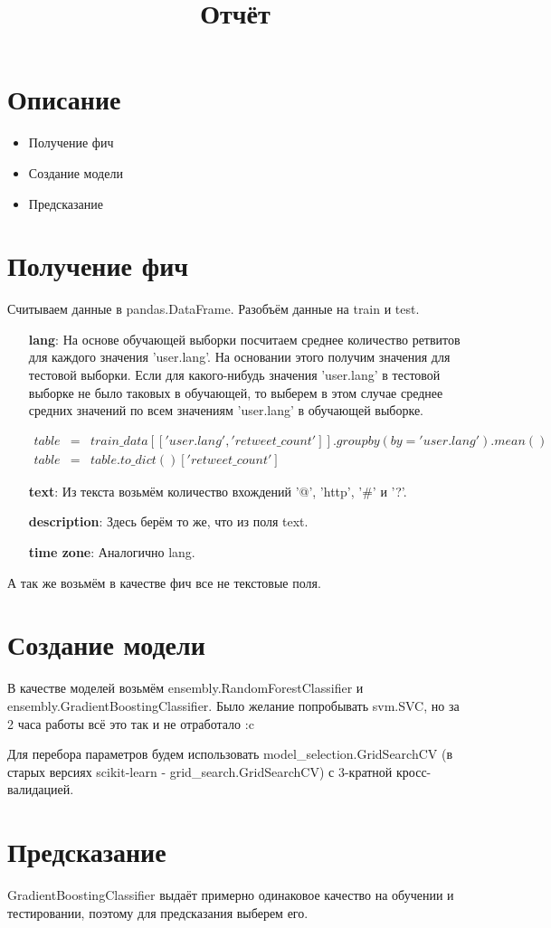 \documentclass[12pt]{article}
\title{Отчёт}
\date{}
\author{}
\begin{document}
 \section{Описание}
 \begin{itemize}
  \item Получение фич
  \item Создание модели
  \item Предсказание
 \end{itemize}
 \section{Получение фич}
 Считываем данные в pandas.DataFrame. Разобъём данные на train и test. 
 \begin{enumerate}
  \item[\textbf{lang}:] На основе обучающей выборки посчитаем среднее количество ретвитов для каждого значения 'user.lang'. На основании этого
			получим значения для тестовой выборки. Если для какого-нибудь значения 'user.lang' в тестовой выборке не было таковых в 
			обучающей, то выберем в этом случае среднее средних значений по всем значениям 'user.lang' в обучающей выборке.
			
			\begin{eqnarray*}
			table &=& train\_data[['user.lang', 'retweet\_count']].groupby(by='user.lang').mean()\\
			table &=& table.to\_dict()['retweet\_count']
			\end{eqnarray*}

  \item[\textbf{text}:] Из текста возьмём количество вхождений '@', 'http', '\#' и '?'.
  \item[\textbf{description}:] Здесь берём то же, что из поля text.
  \item[\textbf{time zone}:] Аналогично lang.
 \end{enumerate}
 А так же возьмём в качестве фич все не текстовые поля. 
\section{Создание модели}

 В качестве моделей возьмём ensembly.RandomForestClassifier и ensembly.GradientBoostingClassifier. Было желание попробывать svm.SVC, но за 
 2 часа работы всё это так и не отработало :c
 
 Для перебора параметров будем использовать model\_selection.GridSearchCV (в старых версиях scikit-learn - grid\_search.GridSearchCV) с 
 3-кратной кросс-валидацией.
\section{Предсказание}
 GradientBoostingClassifier выдаёт примерно одинаковое качество на обучении и тестировании, поэтому для предсказания выберем его.
\end{document}
